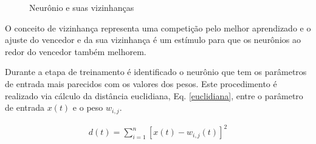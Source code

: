 \begin{figure}[H]
	\centering
	\setlength{\fboxsep}{8pt}
	\setlength{\fboxrule}{0.1pt}
	\caption{Neurônio e suas vizinhanças}
	\label{hiperplano}
\end{figure}

O conceito de vizinhança representa uma competição pelo melhor aprendizado e o ajuste do vencedor e da sua vizinhança é um estímulo para que os neurônios ao redor do vencedor também melhorem.

Durante a etapa de treinamento é identificado o neurônio que tem os parâmetros de entrada mais parecidos com os valores dos pesos. Este procedimento é realizado via cálculo da distância euclidiana, Eq. \ref{euclidiana}, entre o parâmetro de entrada $x(t)$ e o peso $w_{i,j}$.

\begin{eqnarray}
d(t)= \sum^{n}_{i=1}[x(t)-w_{i,j}(t)]^{2}
\label{euclidiana}
\end{eqnarray}

